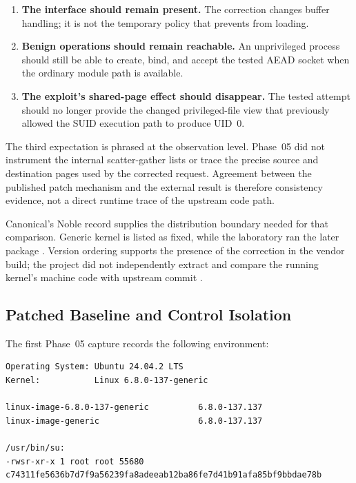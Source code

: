 \begin{enumerate}
    \item \textbf{The interface should remain present.} The correction changes
    buffer handling; it is not the temporary policy that prevents
     from loading.

    \item \textbf{Benign operations should remain reachable.} An unprivileged
    process should still be able to create, bind, and accept the tested AEAD
    socket when the ordinary module path is available.

    \item \textbf{The exploit's shared-page effect should disappear.} The
    tested attempt should no longer provide the changed privileged-file view
    that previously allowed the SUID execution path to produce UID~0.
\end{enumerate}

The third expectation is phrased at the observation level. Phase~05 did not
instrument the internal scatter-gather lists or trace the precise source and
destination pages used by the corrected request. Agreement between the
published patch mechanism and the external result is therefore consistency
evidence, not a direct runtime trace of the upstream code path.

Canonical's Noble record supplies the distribution boundary needed for that
comparison. Generic kernel  is listed as fixed, while the
laboratory ran the later  package
\cite{ubuntu-copyfail-cve}. Version ordering supports the presence of the
correction in the vendor build; the project did not independently extract and
compare the running kernel's machine code with upstream commit
.

\subsection{Patched Baseline and Control Isolation}

The first Phase~05 capture records the following environment:

\begin{lstlisting}
Operating System: Ubuntu 24.04.2 LTS
Kernel:           Linux 6.8.0-137-generic

linux-image-6.8.0-137-generic          6.8.0-137.137
linux-image-generic                    6.8.0-137.137

/usr/bin/su:
-rwsr-xr-x 1 root root 55680
c74311fe5636b7d7f9a56239fa8adeeab12ba86fe7d41b91afa85bf9bbdae78b
\end{lstlisting}


